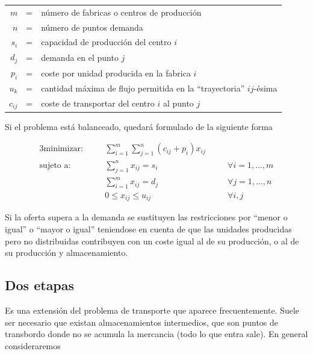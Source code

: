 \begin{center}
    \begin{tabular}{rcl}
        $m$         & = & número de fabricas o centros de producción \\
        $n$         & = & número de puntos demanda \\
        $s_i$       & = & capacidad de producción del centro $i$ \\
        $d_j$       & = & demanda en el punto $j$ \\
        $p_i$       & = & coste por unidad producida en la fabrica $i$ \\
        $u_k$       & = & cantidad máxima de flujo permitida en la ``trayectoria'' $ij$-ésima \\
        $c_{ij}$    & = & coste de transportar del centro $i$ al punto $j$ \\
    \end{tabular}
\end{center}

Si el problema está balanceado, quedará formulado de la siguiente forma

\begin{alignat}{3}
    \text{minimizar:}   & \quad & \sum^m_{i=1}\sum^n_{j=1}(c_{ij}+p_i)x_{ij}    & \quad &                        \\
    \text{sujeto a:}    & \quad & \sum^n_{j=1}x_{ij}= s_i                       &       & \forall i=1,\dots,m    \\
                        & \quad & \sum^m_{i=1}x_{ij}= d_j                       &       & \forall j=1,\dots,n    \\
                        & \quad & 0 \leq x_{ij} \leq u_{ij}                     &       & \forall i,j            
\end{alignat}

Si la oferta supera a la demanda se sustituyen las restricciones por ``menor o igual'' o ``mayor o igual'' teniendose en
cuenta de que las unidades producidas pero no distribuidas contribuyen con un coste igual al de su producción, o al de 
su producción y almacenamiento.

\newpage

\subsection{Dos etapas}

Es una extensión del problema de transporte que aparece frecuentemente. Suele ser necesario que existan almacenamientos
intermedios, que son puntos de transbordo donde no se acumula la mercancia (todo lo que entra sale). En general 
consideraremos

